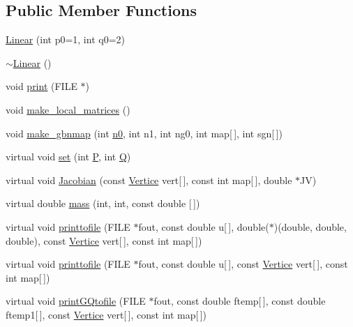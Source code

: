 \subsection*{Public Member Functions}
\begin{DoxyCompactItemize}
\item 
\hyperlink{classLinear_a662bb0cec9af370ae7de4bab5b4f3675}{Linear} (int p0=1, int q0=2)
\item 
\hyperlink{classLinear_a6abe6c2b55a1e1c3e838aaf82e77e627}{$\sim$\+Linear} ()
\item 
void \hyperlink{classLinear_aabc086149c2ed718efe5f7be6c22f8d4}{print} (F\+I\+LE $\ast$)
\item 
void \hyperlink{classLinear_a6d8c4a22ea8c6f2a55baabd682905c92}{make\+\_\+local\+\_\+matrices} ()
\item 
void \hyperlink{classLinear_a3c6456171425bb669ccfb535ae99f11b}{make\+\_\+gbnmap} (int \hyperlink{DG__EI__Header_8h_a5f7b79d1f60dd1c85e99108c66052098}{n0}, int n1, int ng0, int map\mbox{[}$\,$\mbox{]}, int sgn\mbox{[}$\,$\mbox{]})
\item 
virtual void \hyperlink{classLinear_a5cd90cf088a548e3440c905c063d9d6f}{set} (int \hyperlink{classStdel_a05cbb3f2a3fa0bc04a74e347dc6574cf}{P}, int \hyperlink{classStdel_a82074e598ad5af5ec45a3257a3c2b684}{Q})
\item 
virtual void \hyperlink{classLinear_ab1e68626dc6eaf9cbd6432e7adcb3721}{Jacobian} (const \hyperlink{structVertice}{Vertice} vert\mbox{[}$\,$\mbox{]}, const int map\mbox{[}$\,$\mbox{]}, double $\ast$JV)
\item 
virtual double \hyperlink{classLinear_aed8640c00d187985b5303c257323ed91}{mass} (int, int, const double \mbox{[}$\,$\mbox{]})
\item 
virtual void \hyperlink{classLinear_a6d58a6496896386af09591187d08ab73}{printtofile} (F\+I\+LE $\ast$fout, const double u\mbox{[}$\,$\mbox{]}, double($\ast$)(double, double, double), const \hyperlink{structVertice}{Vertice} vert\mbox{[}$\,$\mbox{]}, const int map\mbox{[}$\,$\mbox{]})
\item 
virtual void \hyperlink{classLinear_a8d3d30b9a1367f2cc154b79905554dd7}{printtofile} (F\+I\+LE $\ast$fout, const double u\mbox{[}$\,$\mbox{]}, const \hyperlink{structVertice}{Vertice} vert\mbox{[}$\,$\mbox{]}, const int map\mbox{[}$\,$\mbox{]})
\item 
virtual void \hyperlink{classLinear_ac9e8aae8711e4cbce11a4f685017b1d3}{print\+G\+Qtofile} (F\+I\+LE $\ast$fout, const double ftemp\mbox{[}$\,$\mbox{]}, const double ftemp1\mbox{[}$\,$\mbox{]}, const \hyperlink{structVertice}{Vertice} vert\mbox{[}$\,$\mbox{]}, const int map\mbox{[}$\,$\mbox{]})

\end{DoxyCompactItemize}

